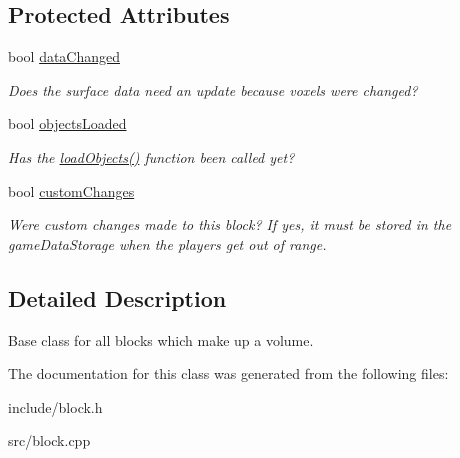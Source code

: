 \subsection*{\-Protected \-Attributes}
\begin{DoxyCompactItemize}
\item 
\hypertarget{classVoxelBlock_a40fabc35dfc78cdacdd6c2d53329db43}{
bool \hyperlink{classVoxelBlock_a40fabc35dfc78cdacdd6c2d53329db43}{data\-Changed}}
\label{d1/d83/classVoxelBlock_a40fabc35dfc78cdacdd6c2d53329db43}

\begin{DoxyCompactList}\small\item\em \-Does the surface data need an update because voxels were changed? \end{DoxyCompactList}\item 
\hypertarget{classVoxelBlock_a0386a61b8cc324cfefae107d44c91c52}{
bool \hyperlink{classVoxelBlock_a0386a61b8cc324cfefae107d44c91c52}{objects\-Loaded}}
\label{d1/d83/classVoxelBlock_a0386a61b8cc324cfefae107d44c91c52}

\begin{DoxyCompactList}\small\item\em \-Has the \hyperlink{classVoxelBlock_ad75047dc35205b32787e2dfd6abba2c0}{load\-Objects()} function been called yet? \end{DoxyCompactList}\item 
\hypertarget{classVoxelBlock_a8c505dd38ee97c2f1b11948b6f566161}{
bool \hyperlink{classVoxelBlock_a8c505dd38ee97c2f1b11948b6f566161}{custom\-Changes}}
\label{d1/d83/classVoxelBlock_a8c505dd38ee97c2f1b11948b6f566161}

\begin{DoxyCompactList}\small\item\em \-Were custom changes made to this block? \-If yes, it must be stored in the game\-Data\-Storage when the players get out of range. \end{DoxyCompactList}\end{DoxyCompactItemize}


\subsection{\-Detailed \-Description}
\-Base class for all blocks which make up a volume. 

\-The documentation for this class was generated from the following files\-:\begin{DoxyCompactItemize}
\item 
include/block.\-h\item 
src/block.\-cpp\end{DoxyCompactItemize}
